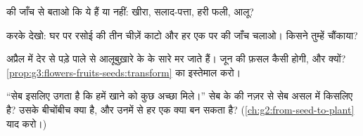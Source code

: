 \begin{exercise}[$\star$]\label{exo:g3:flowers-fruits-seeds:7}
 की जाँच से बताओ कि ये  हैं या नहीं: खीरा, सलाद-पत्ता, हरी फली,
आलू?
\end{exercise}

\begin{exercise}[$\star$]\label{exo:g3:flowers-fruits-seeds:8}
करके देखो: घर पर रसोई की तीन चीज़ें काटो और हर एक पर  की जाँच चलाओ।
किसने तुम्हें चौंकाया?
\end{exercise}

\begin{exercise}[$\star\star$]\label{exo:g3:flowers-fruits-seeds:9}
अप्रैल में देर से पड़े पाले से आलूबुख़ारे के  के सारे  मर जाते
हैं। जून की फ़सल कैसी होगी, और क्यों?
\cref{prop:g3:flowers-fruits-seeds:transform} का इस्तेमाल करो।
\end{exercise}

\begin{exercise}[$\star\star$]\label{exo:g3:flowers-fruits-seeds:10}
``सेब इसलिए उगता है कि हमें खाने को कुछ अच्छा मिले।'' सेब के  की
नज़र से सेब असल में किसलिए है? उसके बीचोंबीच क्या है, और उनमें से हर
एक क्या बन सकता है? (\cref{ch:g2:from-seed-to-plant} याद करो।)
\end{exercise}
